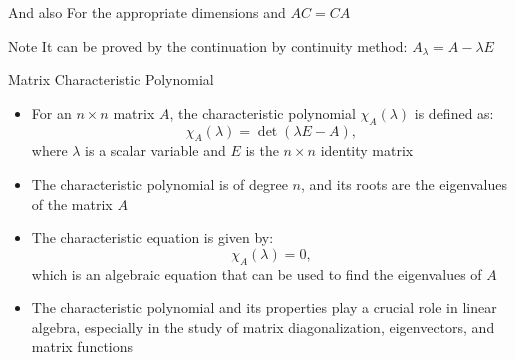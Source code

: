 \documentclass[fullscreen=true, bookmarks=true, hyperref={pdfencoding=unicode}]{beamer}
\begin{document}
\begin{frame}{And also}
  \newcommand{\sidelen}{3cm}
  \newcommand{\shift}{0.25cm}
  \centering
  For the appropriate dimensions and $AC = CA$
  \vspace{1cm}
  

  \begin{block}{Note}
    It can be proved by the continuation by continuity method: $A_\lambda = A - \lambda E$
  \end{block}
\end{frame}


\begin{frame}{Matrix Characteristic Polynomial}
  \begin{itemize}
    \item For an $n \times n$ matrix $A$, the characteristic polynomial 
    $\chi_A(\lambda)$ is defined as:
      \[
        \chi_A(\lambda) = \det(\lambda E - A),
      \]
      where $\lambda$ is a scalar variable and $E$ is the $n \times n$ identity matrix
    \item The characteristic polynomial is of degree $n$, 
    and its roots are the eigenvalues of the matrix $A$
    \item The characteristic equation is given by:
      \[
        \chi_A(\lambda) = 0,
      \]
      which is an algebraic equation that can be used to find the eigenvalues of $A$
    \item The characteristic polynomial and its properties 
    play a crucial role in linear algebra, 
    especially in the study of matrix diagonalization, 
    eigenvectors, and matrix functions
  \end{itemize}
\end{frame}
\end{document}
